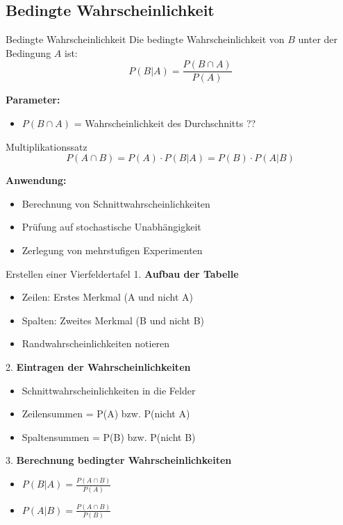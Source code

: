 \subsection{Bedingte Wahrscheinlichkeit}

\begin{definition}{Bedingte Wahrscheinlichkeit}
Die bedingte Wahrscheinlichkeit von $B$ unter der Bedingung $A$ ist:
$$P(B|A)=\frac{P(B \cap A)}{P(A)}$$

\textbf{Parameter:}
\begin{itemize}
    \item $P(B \cap A)$ = Wahrscheinlichkeit des Durchschnitts ??
\end{itemize}
\end{definition}

\begin{theorem}{Multiplikationssatz}
$$P(A \cap B)=P(A) \cdot P(B|A)=P(B) \cdot P(A|B)$$

\textbf{Anwendung:}
\begin{itemize}
    \item Berechnung von Schnittwahrscheinlichkeiten
    \item Prüfung auf stochastische Unabhängigkeit
    \item Zerlegung von mehrstufigen Experimenten
\end{itemize}
\end{theorem}

\begin{KR}{Erstellen einer Vierfeldertafel}
1. \textbf{Aufbau der Tabelle}
   \begin{itemize}
   \item Zeilen: Erstes Merkmal (A und nicht A)
   \item Spalten: Zweites Merkmal (B und nicht B)
   \item Randwahrscheinlichkeiten notieren
   \end{itemize}

2. \textbf{Eintragen der Wahrscheinlichkeiten}
   \begin{itemize}
   \item Schnittwahrscheinlichkeiten in die Felder
   \item Zeilensummen = P(A) bzw. P(nicht A)
   \item Spaltensummen = P(B) bzw. P(nicht B)
   \end{itemize}

3. \textbf{Berechnung bedingter Wahrscheinlichkeiten}
   \begin{itemize}
   \item $P(B|A) = \frac{P(A \cap B)}{P(A)}$
   \item $P(A|B) = \frac{P(A \cap B)}{P(B)}$
   \end{itemize}
\end{KR}

